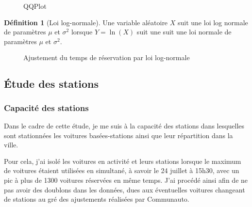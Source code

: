 \documentclass[12pt,a4paper]{article}
\newcommand{\1}[1]{\mathbbm{1}_{\{#1\}} }
\theoremstyle{definition}
\newtheorem{definition}{Définition}
\begin{document}
{\begin{figure}[h]
\caption{QQPlot}
\label{Qplot}

\end{figure}

\begin{definition}[Loi log-normale]
Une variable aléatoire $X$ suit une loi log normale de paramètres $\mu$ et $\sigma^2$ lorsque $Y = \ln(X)$ suit une suit une loi normale de paramètres $\mu$ et $\sigma^2$.
\end{definition}


\begin{figure}[!h]
\centering
{}
\caption{Ajustement du temps de réservation par loi log-normale}
\end{figure}

\subsection{Étude des stations}

\subsubsection{Capacité des stations}
Dans le cadre de cette étude, je me suis  à  la capacité des stations dans lesquelles sont stationnées les voitures basées-stations ainsi que leur répartition dans la ville.

Pour cela, j'ai isolé les voitures en activité et leurs stations lorsque le maximum de voitures étaient utilisées en simultané, à savoir le 24 juillet à 15h30, avec un pic à plus de 1300 voitures réservées en même temps. J'ai procédé ainsi afin de ne pas avoir des doublons dans les données, dues aux éventuelles voitures changeant de stations au gré des ajustements réalisées par Communauto.

}
\end{document}
